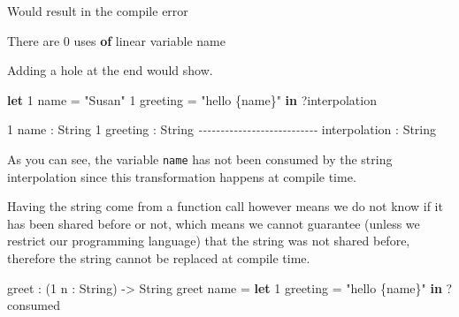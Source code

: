 \documentclass[
]{article}
\newenvironment{Shaded}{}{}
\newcommand{\CommentTok}[1]{\textcolor[rgb]{0.38,0.63,0.69}{\textit{#1}}}
\newcommand{\DataTypeTok}[1]{\textcolor[rgb]{0.56,0.13,0.00}{#1}}
\newcommand{\DecValTok}[1]{\textcolor[rgb]{0.25,0.63,0.44}{#1}}
\newcommand{\KeywordTok}[1]{\textcolor[rgb]{0.00,0.44,0.13}{\textbf{#1}}}
\newcommand{\NormalTok}[1]{#1}
\newcommand{\OperatorTok}[1]{\textcolor[rgb]{0.40,0.40,0.40}{#1}}
\newcommand{\OtherTok}[1]{\textcolor[rgb]{0.00,0.44,0.13}{#1}}
\newcommand{\StringTok}[1]{\textcolor[rgb]{0.25,0.44,0.63}{#1}}
\begin{document}
Would result in the compile error

\begin{Shaded}
\begin{Highlighting}[]
\DataTypeTok{There}\NormalTok{ are }\DecValTok{0}\NormalTok{ uses }\KeywordTok{of}\NormalTok{ linear variable name}
\end{Highlighting}
\end{Shaded}

Adding a hole at the end would show.

\begin{Shaded}
\begin{Highlighting}[]
\KeywordTok{let} \DecValTok{1}\NormalTok{ name }\OtherTok{=} \StringTok{"Susan"}
    \DecValTok{1}\NormalTok{ greeting }\OtherTok{=} \StringTok{"hello \{name\}"} \KeywordTok{in}
    \OperatorTok{?}\NormalTok{interpolation}
\end{Highlighting}
\end{Shaded}

\begin{Shaded}
\begin{Highlighting}[]
\DecValTok{1}\NormalTok{ name }\OperatorTok{:} \DataTypeTok{String}
\DecValTok{1}\NormalTok{ greeting }\OperatorTok{:} \DataTypeTok{String}
\CommentTok{{-}{-}{-}{-}{-}{-}{-}{-}{-}{-}{-}{-}{-}{-}{-}{-}{-}{-}{-}{-}{-}{-}{-}{-}{-}{-}{-}}
\NormalTok{interpolation }\OperatorTok{:} \DataTypeTok{String}
\end{Highlighting}
\end{Shaded}

As you can see, the variable \texttt{name} has not been consumed by the
string interpolation since this transformation happens at compile time.

Having the string come from a function call however means we do not know
if it has been shared before or not, which means we cannot guarantee
(unless we restrict our programming language) that the string was not
shared before, therefore the string cannot be replaced at compile time.

\begin{Shaded}
\begin{Highlighting}[]
\NormalTok{greet }\OperatorTok{:}\NormalTok{ (}\DecValTok{1}\NormalTok{ n }\OperatorTok{:} \DataTypeTok{String}\NormalTok{) }\OtherTok{{-}\textgreater{}} \DataTypeTok{String}
\NormalTok{greet name }\OtherTok{=} \KeywordTok{let} \DecValTok{1}\NormalTok{ greeting }\OtherTok{=} \StringTok{"hello \{name\}"} \KeywordTok{in} \OperatorTok{?}\NormalTok{consumed}
\end{Highlighting}
\end{Shaded}
\end{document}
